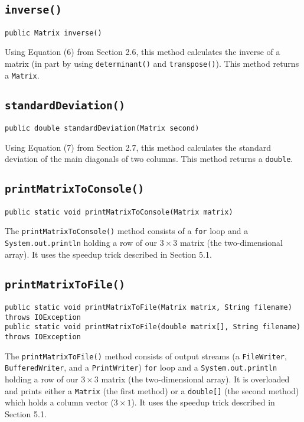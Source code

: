 \documentclass[12pt]{article}
\begin{document}
\subsection{\texttt{inverse()}}
\begin{verbatim}
public Matrix inverse()
\end{verbatim}
Using Equation (6) from Section 2.6, this method calculates the inverse of a matrix (in part by using \texttt{determinant()} and \texttt{transpose()}). This method returns a \texttt{Matrix}.

\subsection{\texttt{standardDeviation()}}
\begin{verbatim}
public double standardDeviation(Matrix second)
\end{verbatim}
Using Equation (7) from Section 2.7, this method calculates the standard deviation of the main diagonals of two columns. This method returns a \texttt{double}.

\subsection{\texttt{printMatrixToConsole()}}
\begin{verbatim}
public static void printMatrixToConsole(Matrix matrix)
\end{verbatim}
The \texttt{printMatrixToConsole()} method consists of a \texttt{for} loop and a \texttt{System.out.println} holding a row of our $3\times3$ matrix (the two-dimensional array). It uses the speedup trick described in Section 5.1.

\subsection{\texttt{printMatrixToFile()}}
\begin{verbatim}
public static void printMatrixToFile(Matrix matrix, String filename) throws IOException 
public static void printMatrixToFile(double matrix[], String filename) throws IOException
\end{verbatim}
The \texttt{printMatrixToFile()} method consists of output streams (a \texttt{FileWriter}, \texttt{BufferedWriter}, and a \texttt{PrintWriter}) \texttt{for} loop and a \texttt{System.out.println} holding a row of our $3\times3$ matrix (the two-dimensional array). It is overloaded and prints either a \texttt{Matrix} (the first method) or a \texttt{double[]} (the second method) which holds a column vector ($3\times1$). It uses the speedup trick described in Section 5.1.
\end{document}
